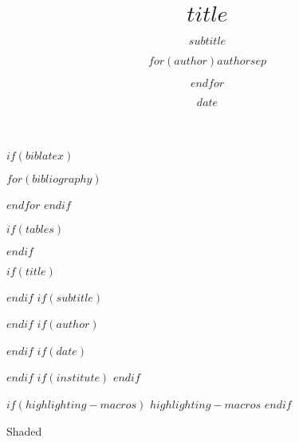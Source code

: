 \usepackage{fontspec}         %
\usepackage[skins]{tcolorbox} %
\usepackage{tikz}             %
\usepackage{calc}             %
\usepackage{beamerbaseframe}
\usepackage{beamerbasemisc}
\usepackage{beamerbasetemplates}
\usetikzlibrary{calc}         %

\usepackage[babelshorthands=true,localmarks=true]{polyglossia}
\setdefaultlanguage{$if(lang)$$lang$$else$en-US$endif$}
\usepackage[
    $if(lang)$$lang$$else$en-US$endif$
]{datetime2}                  %

\usepackage{csquotes}
$if(biblatex)$
\usepackage[$if(biblio-style)$style=$biblio-style$,$endif$$for(biblatexoptions)$$biblatexoptions$$sep$,$endfor$]{biblatex}
$for(bibliography)$

$endfor$
$endif$

\usepackage{hyperref} %
\usepackage{ulem}     %
\providecommand{\tightlist}{\setlength{\itemsep}{0pt}\setlength{\parskip}{0pt}}

$if(tables)$
\usepackage{longtable,booktabs,array}
\usepackage{beamerbasetitle}
\usepackage{beamerbasesection}
\usepackage{beamerbaseoverlay}
$endif$


$if(title)$
\title{$title$}
$endif$
$if(subtitle)$
\subtitle{$subtitle$}
$endif$
$if(author)$
\author{$for(author)$$author$$sep$ \and $endfor$}
$endif$
$if(date)$
\date{$date$}
$endif$
$if(institute)$
$endif$

$if(highlighting-macros)$
$highlighting-macros$
$endif$

\ifcsname Shaded\endcsname
\else
    \newenvironment{Shaded}{}{}
\fi
{}

